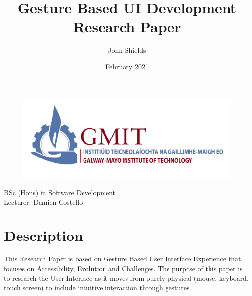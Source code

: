 \documentclass{article}
\title{\huge{\textbf{Gesture Based UI Development}} \\
\LARGE{Research Paper}}
\author{John Shields}
\date{February 2021}
\begin{document}
\clearpage\maketitle
\thispagestyle{empty}
\begin{center}
    \begin{figure}[h]
        \centering
        \includegraphics[width=15cm]{pics/logo-gmit.png}
        \label{fig:logo}
    \end{figure}
    \large{	BSc (Hons) in Software Development \\
    Lecturer: Damien Costello}
\end{center}
\newpage
\setcounter{page}{1}
\tableofcontents
\listoffigures

\newpage
{} %

\section{Description}
This Research Paper is based on Gesture Based User Interface Experience that focuses on Accessibility, Evolution and Challenges. The purpose of this paper is to research the User Interface as it moves from purely physical (mouse, keyboard, touch screen) to include intuitive interaction through gestures.
\end{document}
